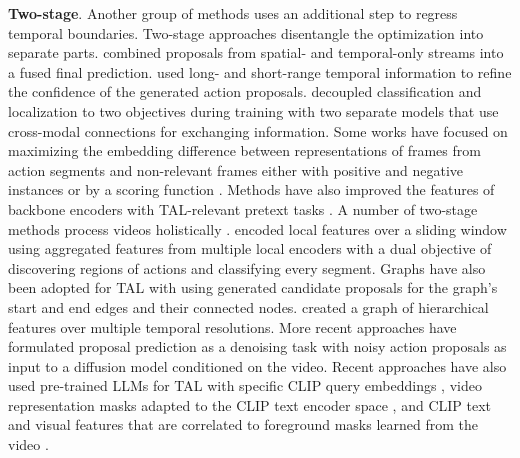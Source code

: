 \noindent
\textbf{Two-stage}. Another group of methods uses an additional step to regress temporal boundaries. Two-stage approaches disentangle the optimization into separate parts. \citet{zhai2020two} combined proposals from spatial- and temporal-only streams into a fused final prediction. \citet{chen2022dcan} used long- and short-range temporal information to refine the confidence of the generated action proposals. \citet{huang2019decoupling} decoupled classification and localization to two objectives during training with two separate models that use cross-modal connections for exchanging information. Some works have focused on maximizing the embedding difference between representations of frames from action segments and non-relevant frames either with positive and negative instances \citep{luo2020weakly,zhang2021cola} or by a scoring function \citep{rizve2023pivotal}. Methods have also improved the features of backbone encoders with TAL-relevant pretext tasks \citep{zhang2022unsupervised}. A number of two-stage methods process videos holistically \citep{alwassel2021tsp,he2022asm,liu2021weakly,qing2021temporal}. \citet{alwassel2021tsp} encoded local features over a sliding window using aggregated features from multiple local encoders with a dual objective of discovering regions of actions and classifying every segment. Graphs have also been adopted for TAL with \citet{bai2020boundary} using generated candidate proposals for the graph's start and end edges and their connected nodes. \citet{zhao2021video} created a graph of hierarchical features over multiple temporal resolutions. More recent approaches \citep{nag2023difftad} have formulated proposal prediction as a denoising task with noisy action proposals as input to a diffusion model conditioned on the video. Recent approaches have also used pre-trained LLMs for TAL with specific CLIP query embeddings \citep{ju2022prompting}, video representation masks adapted to the CLIP text encoder space \citep{nag2022zero}, and CLIP text and visual features that are correlated to foreground masks learned from the video \citep{phan2024zeetad}.


